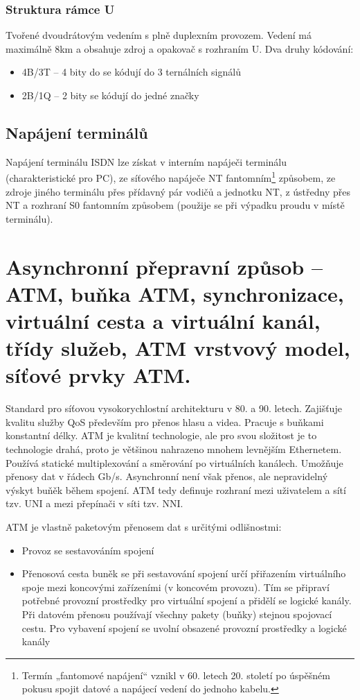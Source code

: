 \subsubsection{Struktura rámce U}

Tvořené dvoudrátovým vedením s plně duplexním provozem. Vedení má maximálně 8km a obsahuje zdroj a opakovač s rozhraním U. Dva druhy kódování:
\begin{itemize}
    \item 4B/3T -- 4 bity do se kódují do 3 ternálních signálů
    \item 2B/1Q -- 2 bity se kódují do jedné značky
\end{itemize}

\subsection{Napájení terminálů}
Napájení terminálu ISDN lze získat v interním napáječi terminálu (charakteristické pro PC), ze síťového napáječe NT fantomním\footnote{Termín „fantomové napájení“ vznikl v 60. letech 20. století po úspěšném pokusu spojit datové a napájecí vedení do jednoho kabelu.} způsobem, ze zdroje jiného terminálu přes přídavný pár vodičů a jednotku NT, z ústředny přes NT a rozhraní S0 fantomním způsobem (použije se při výpadku proudu v místě terminálu).

\clearpage
\section{Asynchronní přepravní způsob – ATM, buňka ATM, synchronizace, virtuální cesta a virtuální kanál, třídy služeb, ATM vrstvový model, síťové prvky ATM.}

Standard pro síťovou vysokorychlostní architekturu v 80. a 90. letech. Zajišťuje kvalitu služby QoS především pro přenos hlasu a videa. Pracuje s buňkami konstantní délky. ATM je kvalitní technologie, ale pro svou složitost je to technologie drahá, proto je většinou nahrazeno mnohem levnějším Ethernetem. Používá statické multiplexování a směrování po virtuálních kanálech. Umožňuje přenosy dat v řádech Gb/s. Asynchronní není však přenos, ale nepravidelný výskyt buňěk během spojení. ATM tedy definuje rozhraní mezi uživatelem a sítí tzv. UNI a mezi přepínači v síti tzv. NNI.

ATM je vlastně paketovým přenosem dat s určitými odlišnostmi:
\begin{itemize}
    \item Provoz se sestavováním spojení
    \item Přenosová cesta buněk se při sestavování spojení určí přiřazením virtuálního spoje mezi koncovými zařízeními (v koncovém provozu). Tím se připraví potřebné provozní prostředky pro virtuální spojení a přidělí se logické kanály. Při datovém přenosu používají všechny pakety (buňky) stejnou spojovací cestu. Pro vybavení spojení se uvolní obsazené provozní prostředky a logické kanály
\end{itemize}

